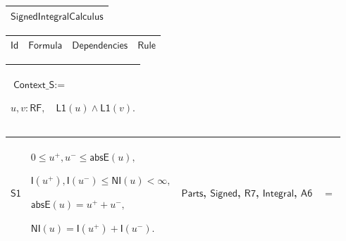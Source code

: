 \documentclass[11pt]{amsart}
\renewcommand{\arraystretch}{1.4}
\newlength{\FTCOneColumnBody}
\newlength{\FTCFourColumnBody}
\begin{document}
{\centering
\renewcommand{\arraystretch}{1.4}
\par\setlength{\parskip}{0pt}\nointerlineskip
\noindent
\begin{tabular}{|@{}>{\centering\arraybackslash}m{\FTCOneColumnBody}|}\hline
$\displaystyle \textsf{SignedIntegralCalculus}$\\ \hline
\end{tabular}%
\par\setlength{\parskip}{0pt}\nointerlineskip
\noindent
\begin{tabular}{|@{}>{\centering\arraybackslash}m{0.078431\FTCFourColumnBody}|>{\centering\arraybackslash}m{0.535947\FTCFourColumnBody}|>{\centering\arraybackslash}m{0.281045\FTCFourColumnBody}|>{\centering\arraybackslash}m{0.104575\FTCFourColumnBody}|}\hline
$\displaystyle \textsf{Id}$ & $\displaystyle \textsf{Formula}$ & $\displaystyle \textsf{Dependencies}$ & $\displaystyle \textsf{Rule}$\\ \hline
\end{tabular}%
\par\setlength{\parskip}{0pt}\nointerlineskip
\noindent
\begin{tabular}{|@{}>{\centering\arraybackslash}m{\FTCOneColumnBody}|}\hline
$\displaystyle \textsf{Context\_S}:=$\par
$\displaystyle u,v:\textsf{RF},\quad\textsf{L1}(u)\land\textsf{L1}(v).$\\ \hline
\end{tabular}%
\par\setlength{\parskip}{0pt}\nointerlineskip
\noindent
\begin{tabular}{|@{}>{\centering\arraybackslash}m{0.078431\FTCFourColumnBody}|>{\centering\arraybackslash}m{0.535947\FTCFourColumnBody}|>{\centering\arraybackslash}m{0.281045\FTCFourColumnBody}|>{\centering\arraybackslash}m{0.104575\FTCFourColumnBody}|}\hline
\hypertarget{dct:S1}{$\displaystyle \textsf{S1}$} & $\displaystyle 0\le u^+,u^-\le\textsf{absE}(u),$\par
$\displaystyle \textsf{I}(u^+),\textsf{I}(u^-)\le\textsf{NI}(u)<\infty,$\par
$\displaystyle \textsf{absE}(u)=u^++u^-,$\par
$\displaystyle \textsf{NI}(u)=\textsf{I}(u^+)+\textsf{I}(u^-).$ & \hyperlink{dctdef:Parts}{$\displaystyle \textsf{Parts}$}, \hyperlink{dctdef:Signed}{$\displaystyle \textsf{Signed}$}, \hyperlink{dct:R7}{$\displaystyle \textsf{R7}$}, \hyperlink{lem:Integral}{$\displaystyle \textsf{Integral}$}, \hyperlink{dct:A6}{$\displaystyle \textsf{A6}$} & $\displaystyle =$\\ \hline

\end{tabular}}
\end{document}
